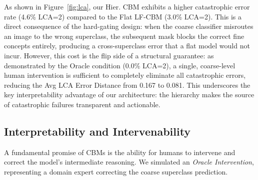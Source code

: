 \documentclass[sigconf, nonacm]{acmart}
\begin{document}
As shown in Figure~\ref{fig:lca}, our Hier. CBM exhibits a higher catastrophic error rate (4.6\% LCA=2) compared to the Flat LF-CBM (3.0\% LCA=2). This is a direct consequence of the hard-gating design: when the coarse classifier misroutes an image to the wrong superclass, the subsequent mask blocks the correct fine concepts entirely, producing a cross-superclass error that a flat model would not incur. However, this cost is the flip side of a structural guarantee: as demonstrated by the Oracle condition (0.0\% LCA=2), a single, coarse-level human intervention is sufficient to completely eliminate all catastrophic errors, reducing the Avg LCA Error Distance from 0.167 to 0.081. This underscores the key interpretability advantage of our architecture: the hierarchy makes the source of catastrophic failures transparent and actionable.


\subsection{Interpretability and Intervenability}
A fundamental promise of CBMs is the ability for humans to intervene and correct the model's intermediate reasoning. We simulated an \textit{Oracle Intervention}, representing a domain expert correcting the coarse superclass prediction. 

\begin{table}[htbp]
\caption{Performance Comparison across Models. \\ \small Results highlight the Oracle's perfect mitigation of catastrophic errors and its minimal active concept footprint.}
\label{tab:results}
\end{table}
\end{document}
